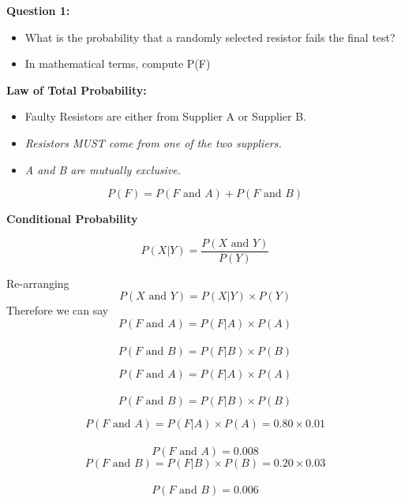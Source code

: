 \documentclass[12pt]{report}
\begin{document}
		\Large
		\vspace{-1.5cm}
		\textbf{Question 1:}
		\begin{itemize}
			\item What is the probability that a randomly selected resistor fails the final test?
			
			\item In mathematical terms, compute P(F) 
		\end{itemize}
		
		
		
		
		
		\Large
		\textbf{Law of Total Probability:}
		\begin{itemize}
			\item Faulty Resistors are either from Supplier A or Supplier B.
			\vspace{0.3cm} 
			\item \textit{Resistors MUST come from one of the two suppliers.}
			\item \textit{A and B are mutually exclusive.}
		\end{itemize}
		\vspace{0.3cm} 
		\[ P(F) = P(F \mbox{ and } A) + P(F \mbox{ and } B) \]
		
		
		
		
		\Large
		\textbf{Conditional Probability}
		
		\[ P(X|Y)  = \frac{P(X \mbox{ and } Y)}{P(Y)} \]
		
		Re-arranging
		\[ P(X \mbox{ and } Y) =  P(X|Y)\times P(Y) \]
		Therefore we can say
		\[ P(F \mbox{ and } A) =  P(F|A)\times P(A) \]\\
		\[ P(F \mbox{ and } B) =  P(F|B)\times P(B) \]
		
		
		
		\Large
		\vspace{-1.5cm}
		\[ P(F \mbox{ and } A) =  P(F|A)\times P(A) \]\\
		\vspace{1.7cm}
		\[ P(F \mbox{ and } B) =  P(F|B)\times P(B) \]
		
		
		
		\Large
		\[ P(F \mbox{ and } A) =  P(F|A)\times P(A) = 0.80 \times 0.01\]\\
		\[ P(F \mbox{ and } A) = 0.008\]
		\bigskip
		\[ P(F \mbox{ and } B) =  P(F|B)\times P(B) = 0.20 \times 0.03\]\\
		\[ P(F \mbox{ and } B) = 0.006\]
		
\end{document}
